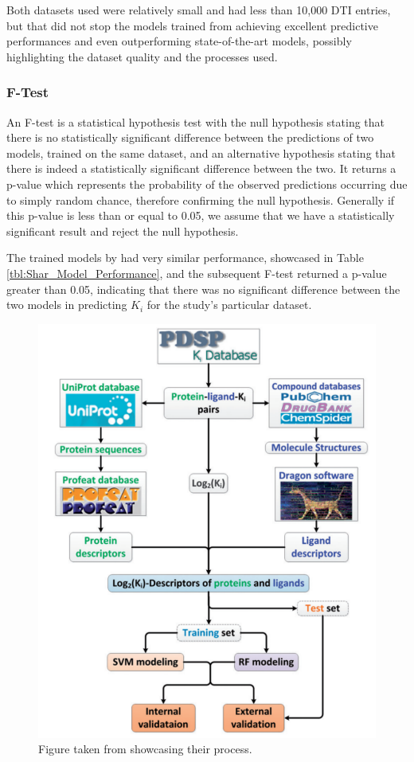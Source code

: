 Both datasets used were relatively small and had less than 10,000 DTI entries, but that did not stop the models trained from achieving excellent predictive performances and even outperforming state-of-the-art models, possibly highlighting the dataset quality and the processes used.

\subsubsection{F-Test}

An F-test is a statistical hypothesis test with the null hypothesis stating that there is no statistically significant difference between the predictions of two models, trained on the same dataset, and an alternative hypothesis stating that there is indeed a statistically significant difference between the two. It returns a p-value which represents the probability of the observed predictions occurring due to simply random chance, therefore confirming the null hypothesis. Generally if this p-value is less than or equal to 0.05, we assume that we have a statistically significant result and reject the null hypothesis.

The trained models by \citet{Shar2016}  had very similar performance, showcased in Table \ref{tbl:Shar_Model_Performance}, and the subsequent F-test returned a p-value greater than 0.05, indicating that there was no significant difference between the two models in predicting $K_i$ for the study's particular dataset.

\begin{figure}[!ht]
    \centering
    \includegraphics[width=0.8\linewidth]{images/Shar_Process.pdf}    
    \caption{Figure taken from \citet{Shar2016} showcasing their process.}
    \label{fig:Shar_Process} 
\end{figure}


